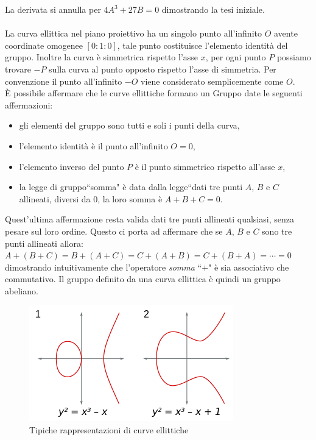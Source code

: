 \documentclass[a4paper,12pt]{tesiinfo}
\begin{document}
La derivata si annulla per $4A^3+27B = 0$ dimostrando la tesi iniziale.\\
\\
La curva ellittica nel piano proiettivo ha un singolo punto all'infinito $O$ avente coordinate omogenee $[0:1:0]$, tale punto costituisce l'elemento identit\`a del gruppo. Inoltre la curva \`e simmetrica rispetto l'asse $x$, per ogni punto $P$ possiamo trovare $-P$ sulla curva al punto opposto rispetto l'asse di simmetria. Per convenzione il punto all'infinito $-O$ viene considerato semplicemente come $O$.\\
\`E possibile affermare che le curve ellittiche formano un Gruppo date le seguenti affermazioni:
\begin{itemize}
    \item gli elementi del gruppo sono tutti e soli i punti della curva,
    \item l'elemento identit\`a \`e il punto all'infinito $O = 0$,
    \item l'elemento inverso del punto $P$ \`e il punto simmetrico rispetto all'asse $x$,
    \item la legge di gruppo``somma" \`e data dalla legge``dati tre punti $A$, $B$ e $C$ allineati, diversi da $0$, la loro somma \`e $A+B+C=0$.
\end{itemize}
Quest'ultima affermazione resta valida dati tre punti allineati qualsiasi, senza pesare sul loro ordine. Questo ci porta ad affermare che se $A$, $B$ e $C$ sono tre punti allineati allora:\\
$A+(B+C)=B+(A+C)=C+(A+B)=C+(B+A)=\cdots = 0$\\
dimostrando intuitivamente che l'operatore \textit{somma} ``$+$" \`e sia associativo che commutativo. Il gruppo definito da una curva ellittica \`e quindi un gruppo abeliano.
\begin{figure}[H]
    \includegraphics[width=.8\textwidth,center]{commonEC}
    \caption{Tipiche rappresentazioni di curve ellittiche}
\end{figure}
\end{document}
